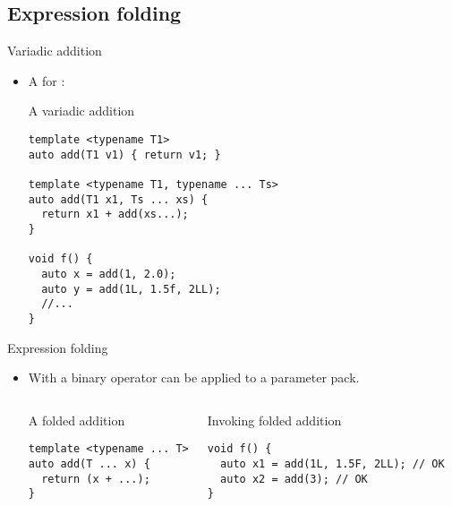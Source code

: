 \subsection{Expression folding}

\begin{frame}[t,fragile]{Variadic addition}
\begin{itemize}
  \item A  for :

\begin{block}{A variadic addition}
\begin{lstlisting}
template <typename T1>
auto add(T1 v1) { return v1; }

template <typename T1, typename ... Ts>
auto add(T1 x1, Ts ... xs) {
  return x1 + add(xs...);
}

void f() {
  auto x = add(1, 2.0);
  auto y = add(1L, 1.5f, 2LL);
  //...
}
\end{lstlisting}
\end{block}
\end{itemize}
\end{frame}

\begin{frame}[t,fragile]{Expression folding}
\begin{itemize}
  \item With  a binary operator
        can be applied to a parameter pack.

\begin{columns}[T]

\begin{block}{A folded addition}
\begin{lstlisting}
template <typename ... T>
auto add(T ... x) {
  return (x + ...);
}
\end{lstlisting}
\end{block}

\begin{block}{Invoking folded addition}
\begin{lstlisting}
void f() {
  auto x1 = add(1L, 1.5F, 2LL); // OK
  auto x2 = add(3); // OK
}
\end{lstlisting}
\end{block}

\end{columns}
\end{itemize}
\end{frame}

